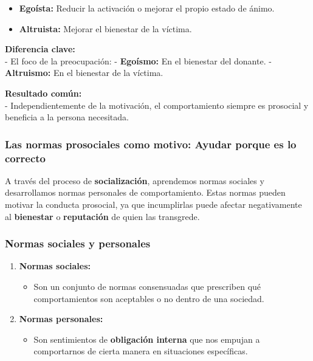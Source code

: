 \documentclass[
]{book}
\providecommand{\tightlist}{%
  \setlength{\itemsep}{0pt}\setlength{\parskip}{0pt}}
\begin{document}
\begin{itemize}
\tightlist
\item
  \textbf{Egoísta:} Reducir la activación o mejorar el propio estado de ánimo.
\item
  \textbf{Altruista:} Mejorar el bienestar de la víctima.
\end{itemize}

\textbf{Diferencia clave:}\\
- El foco de la preocupación:
- \textbf{Egoísmo:} En el bienestar del donante.
- \textbf{Altruismo:} En el bienestar de la víctima.

\textbf{Resultado común:}\\
- Independientemente de la motivación, el comportamiento siempre es prosocial y beneficia a la persona necesitada.

\subsubsection{Las normas prosociales como motivo: Ayudar porque es lo correcto}\label{las-normas-prosociales-como-motivo-ayudar-porque-es-lo-correcto}

A través del proceso de \textbf{socialización}, aprendemos normas sociales y desarrollamos normas personales de comportamiento. Estas normas pueden motivar la conducta prosocial, ya que incumplirlas puede afectar negativamente al \textbf{bienestar} o \textbf{reputación} de quien las transgrede.

\subsubsection{Normas sociales y personales}\label{normas-sociales-y-personales}

\begin{enumerate}
\def\labelenumi{\arabic{enumi}.}
\tightlist
\item
  \textbf{Normas sociales:}

  \begin{itemize}
  \tightlist
  \item
    Son un conjunto de normas consensuadas que prescriben qué comportamientos son aceptables o no dentro de una sociedad.
  \end{itemize}
\item
  \textbf{Normas personales:}

  \begin{itemize}
  \tightlist
  \item
    Son sentimientos de \textbf{obligación interna} que nos empujan a comportarnos de cierta manera en situaciones específicas.
  \end{itemize}
\end{enumerate}
\end{document}

